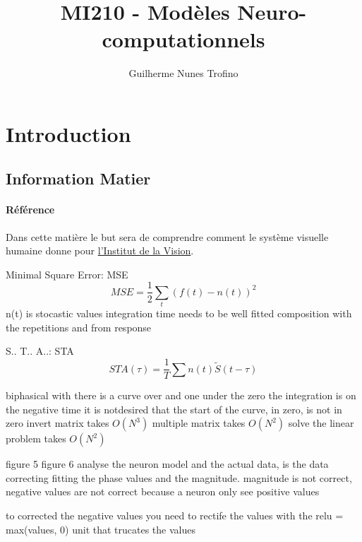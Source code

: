 \documentclass{article}
\title{MI210 - Modèles Neuro-computationnels}
\author{Guilherme Nunes Trofino}
\begin{document}
\maketitle
\setlength{\parindent}{0pt}

\newpage\tableofcontents

\section{Introduction}

% 
% 
% 

\subsection{Information Matier}
\paragraph{Référence}Dans cette matière le but sera de comprendre comment le système visuelle humaine donne pour \href{http://oliviermarre.free.fr/index.php/teaching/}{l'Institut de la Vision}.

Minimal Square Error: MSE
\begin{equation}
    MSE = \frac{1}{2} \sum_{t}(f(t) - n(t))^2
\end{equation}
n(t) is stocastic values
integration time needs to be well fitted
composition with the repetitions and from response

S.. T.. A..: STA
\begin{equation}
    STA(\tau) = \frac{1}{T} \sum n(t) \tilde{S}(t -\tau)
\end{equation}

biphasical with there is a curve over and one under the zero
the integration is on the negative time
it is notdesired that the start of the curve, in zero, is not in zero
invert matrix takes $O(N^3)$
multiple matrix takes $O(N^2)$
solve the linear problem takes $O(N^2)$


figure 5 figure 6
analyse the neuron model and the actual data, is the data correcting fitting the phase values and the magnitude. magnitude is not correct, negative values are not correct because a neuron only see positive values

to corrected the negative values you need to rectife the values with the relu = max(values, 0) unit that trucates the values
\end{document}
